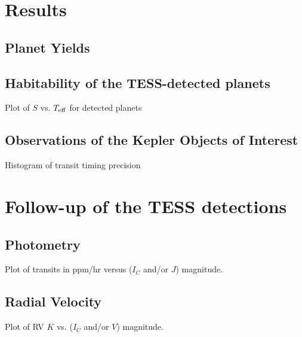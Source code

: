 \documentclass[preprint]{aastex}
\def \teff {T_{\rm eff}}
\begin{document}
\section{Results}
\subsection{Planet Yields}
\subsection{Habitability of the TESS-detected planets}
Plot of $S$ vs. $\teff$ for detected planets
\subsection{Observations of the Kepler Objects of Interest}
Histogram of transit timing precision

\section{Follow-up of the TESS detections}
\subsection{Photometry}
Plot of transits in ppm/hr versus ($I_C$ and/or $J$) magnitude.
\subsection{Radial Velocity}
Plot of RV $K$ vs. ($I_C$ and/or $V$) magnitude.



\acknowledgements

%
\end{document}

